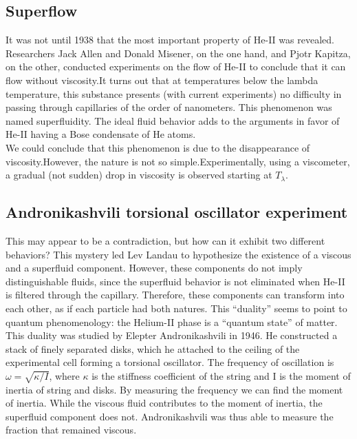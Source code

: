 \documentclass{article}
\begin{document}
\subsection{Superflow}

It was not until 1938 that the most important property of He-II was revealed.
Researchers Jack Allen and Donald Misener, on the one hand, and Pjotr Kapitza, on the other, conducted experiments on the flow of He-II to conclude that it can flow without viscosity.It turns out that at temperatures below the lambda temperature, this substance presents (with current experiments) no difficulty in passing through capillaries of the order of nanometers. This phenomenon was named superfluidity. The ideal fluid behavior adds to the arguments in favor of He-II having a Bose condensate of He atoms.
\\

We could conclude that this phenomenon is due to the disappearance of viscosity.However, the nature is not so simple.Experimentally, using a viscometer, a gradual (not sudden) drop in viscosity is observed starting at $T_\lambda$.
\\

\subsection{Andronikashvili torsional oscillator experiment}

This may appear to be a contradiction, but how can it exhibit two different behaviors? This mystery led Lev Landau to hypothesize the existence of a viscous and a superfluid component. However, these components do not imply distinguishable fluids, since the superfluid behavior is not eliminated when He-II is filtered through the capillary. Therefore, these components can transform into each other, as if each particle had both natures. This “duality” seems to point to quantum phenomenology: the Helium-II phase is a “quantum state” of matter.
\\

This duality was studied by Elepter Andronikashvili in 1946. He constructed a stack of finely separated disks, which he attached to the ceiling of the experimental cell forming a torsional oscillator. The frequency of oscillation is $\omega = \sqrt{\kappa/I}$, where $\kappa$ is the stiffness coefficient of the string and I is the moment of inertia of string and disks. By measuring the frequency we can find the moment of inertia. While the viscous fluid contributes to the moment of inertia, the superfluid component does not. Andronikashvili was thus able to measure the fraction that remained viscous.
\\
\end{document}
